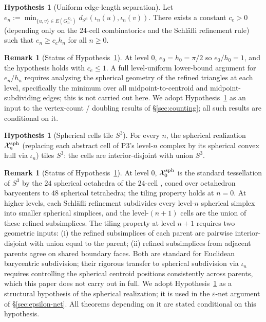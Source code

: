 \documentclass[11pt, a4paper]{amsart}
\theoremstyle{definition}
\newtheorem{remark}[theorem]{Remark}
\newtheorem{hypothesis}[theorem]{Hypothesis}
\newcommand{\dsph}{d_{S^3}}
\begin{document}
\begin{hypothesis}[Uniform edge-length separation]
\label{fact:separation}
Let $e_n := \min_{\{u, v\} \in E(G_n^{D_4})} \dsph(\iota_n(u),
\iota_n(v))$. There exists a constant $c_e > 0$ (depending only on
the $24$-cell combinatorics and the Schl\"afli refinement rule)
such that $e_n \geq c_e h_n$ for all $n \geq 0$.
\end{hypothesis}

\begin{remark}[Status of Hypothesis~\ref{fact:separation}]
\label{rmk:separation-status}
At level $0$, $e_0 = h_0 = \pi/2$ so $e_0/h_0 = 1$, and the
hypothesis holds with $c_e \leq 1$. A full level-uniform
lower-bound argument for $e_n/h_n$ requires analysing the
spherical geometry of the refined triangles at each level,
specifically the minimum over all midpoint-to-centroid and
midpoint-subdividing edges; this is not carried out here. We
adopt Hypothesis~\ref{fact:separation} as an input to the
vertex-count / doubling results of \S\ref{sec:counting}; all
such results are conditional on it.
\end{remark}

\begin{hypothesis}[Spherical cells tile $S^3$]
\label{fact:tiling}
For every $n$, the spherical realization $\mathcal X_n^{\rm sph}$
(replacing each abstract cell of P3's level-$n$ complex by its
spherical convex hull via $\iota_n$) tiles $S^3$: the cells are
interior-disjoint with union $S^3$.
\end{hypothesis}

\begin{remark}[Status of Hypothesis~\ref{fact:tiling}]
\label{rmk:tiling-status}
At level $0$, $\mathcal X_0^{\rm sph}$ is the standard tessellation
of $S^3$ by the $24$ spherical octahedra of the $24$-cell
\cite[\S 22.2]{CoxeterRegularPolytopes}, coned over octahedron
barycenters to $48$ spherical tetrahedra; the tiling property
holds at $n = 0$. At higher levels, each Schl\"afli refinement
subdivides every level-$n$ spherical simplex into smaller
spherical simplices, and the level-$(n+1)$ cells are the union
of these refined subsimplices. The tiling property at level
$n+1$ requires two geometric inputs: (i) the refined subsimplices
of each parent are pairwise interior-disjoint with union equal
to the parent; (ii) refined subsimplices from adjacent parents
agree on shared boundary faces. Both are standard for Euclidean
barycentric subdivision; their rigorous transfer to spherical
subdivision via $\iota_n$ requires controlling the spherical
centroid positions consistently across parents, which this paper
does not carry out in full. We adopt
Hypothesis~\ref{fact:tiling} as a structural hypothesis of the
spherical realization; it is used in the $\varepsilon$-net
argument of \S\ref{sec:epsilon-net}. All theorems depending on
it are stated conditional on this hypothesis.
\end{remark}
\end{document}
